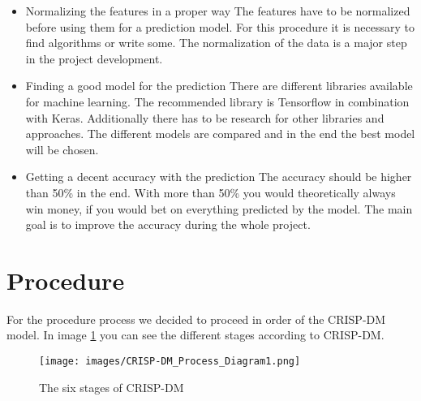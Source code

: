 \begin{itemize}
\begin{itemize}
			\item Normalizing the features in a proper way \newline
			The features have to be normalized before using them for a prediction model. For this procedure it is necessary to find algorithms or write some. The normalization of the data is a major step in the project development.
			\item Finding a good model for the prediction 
			There are different libraries available for machine learning. The recommended library is Tensorflow in combination with Keras. Additionally there has to be research for other libraries and approaches. The different models are compared and in the end the best model will be chosen. 
			\item Getting a decent accuracy with the prediction \newline
			The accuracy should be higher than 50\% in the end. With more than 50\% you would theoretically always win money, if you would bet on everything predicted by the model. The main goal is to improve the accuracy during the whole project. 
		\end{itemize}
\end{itemize}
\section{Procedure}

For the procedure process we decided to proceed in order of the CRISP-DM model. In image \ref{CRISImage} you can see the different stages according to CRISP-DM.

\begin{figure}[h]
\centering
\texttt{[image: images/CRISP-DM\_Process\_Diagram1.png]}
\caption{The six stages of CRISP-DM \cite{CRISPDig:2012}}
\label{CRISImage}
\end{figure}

